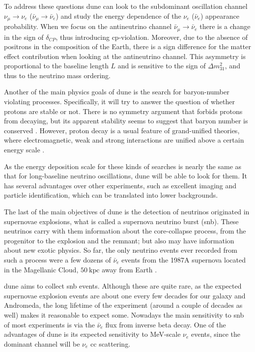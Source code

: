 To address these questions \gls{dune} can look to the subdominant oscillation channel $\nu_{\mu} \rightarrow \nu_{e}$ ($\bar{\nu}_{\mu} \rightarrow \bar{\nu}_{e}$) and study the energy dependence of the $\nu_{e}$ ($\bar{\nu}_{e}$) appearance probability. When we focus on the antineutrino channel $\bar{\nu}_{\mu} \rightarrow \bar{\nu}_{e}$ there is a change in the sign of $\delta_{CP}$, thus introducing \gls{cp}-violation. Moreover, due to the absence of positrons in the composition of the Earth, there is a sign difference for the matter effect contribution when looking at the antineutrino channel. This asymmetry is proportional to the baseline length $L$ and is sensitive to the sign of $\Delta m^{2}_{31}$, and thus to the neutrino mass ordering.

Another of the main physics goals of \gls{dune} is the search for baryon-number violating processes. Specifically, it will try to answer the question of whether protons are stable or not. There is no symmetry argument that forbids protons from decaying, but its apparent stability seems to suggest that baryon number is conserved \cite{Super-Kamiokande2009}. However, proton decay is a usual feature of grand-unified theories, where electromagnetic, weak and strong interactions are unified above a certain energy scale \cite{Raby2006}.

As the energy deposition scale for these kinds of searches is nearly the same as that for long-baseline neutrino oscillations, \gls{dune} will be able to look for them. It has several advantages over other experiments, such as excellent imaging and particle identification, which can be translated into lower backgrounds.

The last of the main objectives of \gls{dune} is the detection of neutrinos originated in supernovae explosions, what is called a supernova neutrino burst (\gls{snb}). These neutrinos carry with them information about the core-collapse process, from the progenitor to the explosion and the remnant; but also may have information about new exotic physics. So far, the only neutrino events ever recorded from such a process were a few dozens of $\bar{\nu}_{e}$ events from the 1987A supernova located in the Magellanic Cloud, $50~\mathrm{kpc}$ away from Earth \cite{Kamiokande-II1987, Bionta1987}.

\gls{dune} aims to collect \gls{snb} events. Although these are quite rare, as the expected supernovae explosion events are about one every few decades for our galaxy and Andromeda, the long lifetime of the experiment (around a couple of decades as well) makes it reasonable to expect some. Nowadays the main sensitivity to \gls{snb} of most experiments is via the $\bar{\nu}_{e}$ flux from inverse beta decay. One of the advantages of \gls{dune} is its expected sensitivity to MeV-scale $\nu_{e}$ events, since the dominant channel will be $\nu_{e}$ \gls{cc} scattering.

